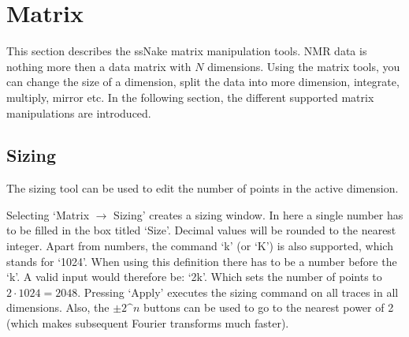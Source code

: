 \documentclass[11pt,a4paper]{article}
\begin{document}
\section{Matrix}
This section describes the ssNake matrix manipulation tools.
NMR data is nothing more then a data matrix with $N$ dimensions.
Using the matrix tools, you can change the size of a dimension, split the data into more dimension, integrate, multiply, mirror etc.
In the following section, the different supported matrix manipulations are introduced.

\subsection{Sizing}
The sizing tool can be used to edit the number of points in the active dimension.



Selecting `Matrix $\rightarrow$ Sizing' creates a sizing window.
In here a single number has to be filled in the box titled `Size'.
Decimal values will be rounded to the nearest integer.
Apart from numbers, the command `k' (or `K') is also supported, which stands for `1024'. When using this definition there has to be a number before the `k'.
A valid input would therefore be: `2k'.
Which sets the number of points to $2 \cdot 1024=2048$.
Pressing `Apply' executes the sizing command on all traces in all dimensions.
Also, the $\pm 2\text{\textasciicircum}n$ buttons can be used to go to the nearest power of 2 (which makes subsequent Fourier transforms much faster).
\end{document}
